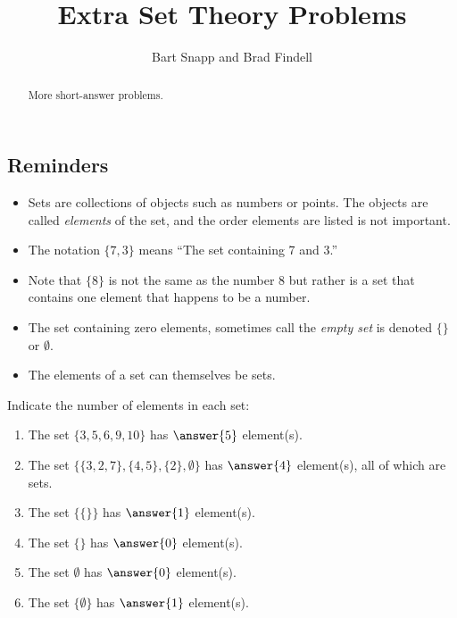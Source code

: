 \documentclass[nooutcomes]{ximera}
\title{Extra Set Theory Problems}
\author{Bart Snapp and Brad Findell}
\begin{document}
\begin{abstract}
More short-answer problems. 
\end{abstract}
\maketitle

\subsection*{Reminders}
\begin{itemize}
\item Sets are collections of objects such as numbers or points.  The objects are called \emph{elements} of the set, and the order elements are listed is not important.  

\item The notation $\{7, 3\}$ means ``The set containing 7 and 3.''  

\item Note that $\{8\}$ is not the same as the number 8 but rather is a set that contains one element that happens to be a number. 

\item The set containing zero elements, sometimes call the \emph{empty set} is denoted $\{\}$ or $\emptyset$.  

\item The elements of a set can themselves be sets.  

\end{itemize}


\begin{problem}
Indicate the number of elements in each set: 
\begin{enumerate}
\item The set $\{3, 5, 6, 9, 10\}$ has $\answer{5}$ element(s).
\item The set $\{ \{3,2,7\}, \{4,5\}, \{2\}, \emptyset \}$ has $\answer{4}$ element(s), all of which are sets. 
\item The set $\{ \{ \} \}$ has $\answer{1}$ element(s).
\item The set $\{\}$ has $\answer{0}$ element(s).
\item The set $\emptyset$ has $\answer{0}$ element(s).
\item The set $\{ \emptyset \}$ has $\answer{1}$ element(s).
\end{enumerate}

\end{problem}
\end{document}
